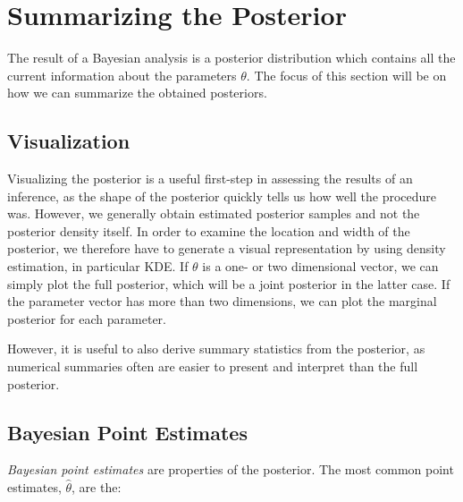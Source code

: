 \section{Summarizing the Posterior}

The result of a Bayesian analysis is a posterior distribution which contains all the current information about the parameters $\theta$. The focus of this section will be on how we can summarize the obtained posteriors.%


\subsection{Visualization} 

Visualizing the posterior is a useful first-step in assessing the results of an inference, as the shape of the posterior quickly tells us how well the procedure was. However, we generally obtain estimated posterior samples and not the posterior density itself. In order to examine the location and width of the posterior, we therefore have to generate a visual representation by using density estimation, in particular KDE. If $\theta$ is a one- or two dimensional vector, we can simply plot the full posterior, which will be a joint posterior in the latter case. If the parameter vector has more than two dimensions, we can plot the marginal posterior for each parameter.

However, it is useful to also derive summary statistics from the posterior, as numerical summaries often are easier to present and interpret than the full posterior. 

\subsection{Bayesian Point Estimates}

\textit{Bayesian point estimates} are properties of the posterior. The most common point estimates, $\hat{\theta}$, are the:

